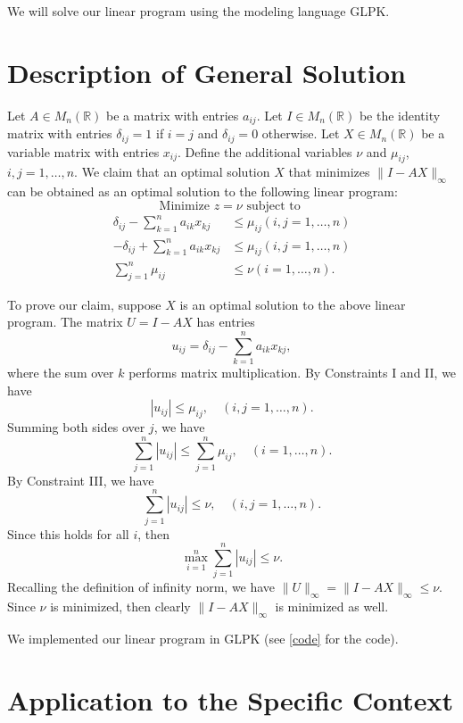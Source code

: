 \documentclass[12pt, a4paper, notitlepage]{report}
\newcommand{\RR}{\mathbb{R}}
\begin{document}
We will solve our linear program using the modeling language GLPK.

\section{Description of General Solution}

Let $A\in M_n(\RR)$ be a matrix with entries $a_{ij}$. Let $I\in M_n(\RR)$ be the identity matrix with entries $\delta_{ij}=1$ if $i=j$ and $\delta_{ij}=0$ otherwise. Let $X\in M_n(\RR)$ be a variable matrix with entries $x_{ij}$. Define the additional variables $\nu$ and $\mu_{ij}$, $i,j=1,\ldots,n$. We claim that an optimal solution $X$ that minimizes $\|I-AX\|_\infty$ can be obtained as an optimal solution to the following linear program:
\[ \mbox{Minimize } z=\nu \mbox{ subject to } \]
\begin{align*}
\delta_{ij} - \sum_{k=1}^n a_{ik}x_{kj} &\leq \mu_{ij} (i,j=1,\ldots, n) \tag{Constraint I} \\
-\delta_{ij} + \sum_{k=1}^n a_{ik}x_{kj} &\leq \mu_{ij} (i,j=1,\ldots,n) \tag{Constraint II} \\
\sum_{j=1}^n \mu_{ij} &\leq \nu (i=1,\ldots,n). \tag{Constraint III}
\end{align*}

To prove our claim, suppose $X$ is an optimal solution to the above linear program. The matrix $U=I-AX$ has entries
\[ u_{ij} = \delta_{ij}-\sum_{k=1}^n a_{ik}x_{kj}, \]
where the sum over $k$ performs matrix multiplication. By Constraints I and II, we have
\[ |u_{ij}| \leq \mu_{ij}, \quad (i,j=1,\ldots,n). \]
Summing both sides over $j$, we have
\[ \sum_{j=1}^n |u_{ij}| \leq \sum_{j=1}^n \mu_{ij}, \quad (i=1,\ldots,n). \]
By Constraint III, we have
\[ \sum_{j=1}^n |u_{ij}| \leq \nu, \quad (i,j=1,\ldots,n). \]
Since this holds for all $i$, then
\[ \max_{i=1}^n\sum_{j=1}^n |u_{ij}| \leq \nu. \]
Recalling the definition of infinity norm, we have $\|U\|_\infty=\|I-AX\|_\infty\leq \nu$. Since $\nu$ is minimized, then clearly $\|I-AX\|_\infty$ is minimized as well.

We implemented our linear program in GLPK (see \ref{code} for the code).

\section{Application to the Specific Context}
\end{document}
